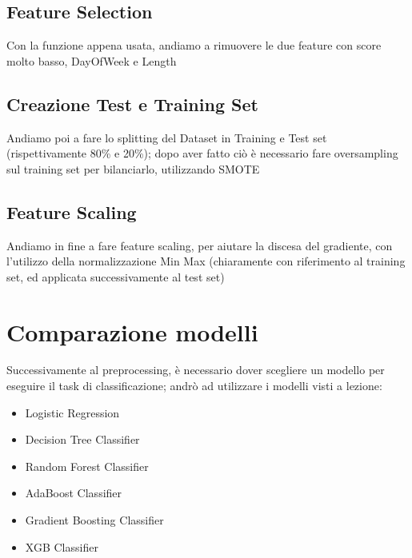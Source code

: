 \documentclass{article}
\begin{document}
\subsection{Feature Selection}
Con la funzione appena usata, andiamo a rimuovere le due feature con score molto basso, DayOfWeek e Length
\subsection{Creazione Test e Training Set}
Andiamo poi a fare lo splitting del Dataset in Training e Test set (rispettivamente 80\% e 20\%); dopo aver fatto ciò è necessario fare oversampling sul training set per bilanciarlo, utilizzando SMOTE
\subsection{Feature Scaling}
Andiamo in fine a fare feature scaling, per aiutare la discesa del gradiente, con l'utilizzo della normalizzazione Min Max (chiaramente con riferimento al training set, ed applicata successivamente al test set)

\section{Comparazione modelli}
Successivamente al preprocessing, è necessario dover scegliere un modello per eseguire il task di classificazione; andrò ad utilizzare i modelli visti a lezione:

\begin{itemize}
\item Logistic Regression \\
\item Decision Tree Classifier \\
\item Random Forest Classifier \\
\item AdaBoost Classifier \\
\item Gradient Boosting Classifier  \\
\item XGB Classifier \\
\end{itemize}
\end{document}

